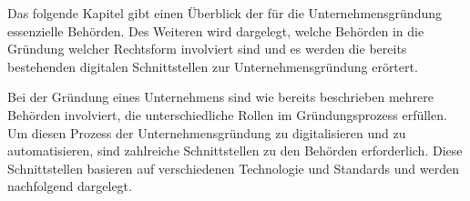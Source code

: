 

Das folgende Kapitel gibt einen Überblick der für die Unternehmensgründung essenzielle Behörden. 
Des Weiteren wird dargelegt, welche Behörden in die Gründung welcher Rechtsform involviert sind und 
es werden die bereits bestehenden digitalen Schnittstellen zur Unternehmensgründung erörtert.

Bei der Gründung eines Unternehmens sind wie bereits beschrieben mehrere Behörden
involviert, die unterschiedliche Rollen im Gründungsprozess erfüllen.
Um diesen Prozess der Unternehmensgründung zu digitalisieren und zu automatisieren, sind zahlreiche Schnittstellen zu den Behörden erforderlich.
Diese Schnittstellen basieren auf verschiedenen Technologie und Standards und werden nachfolgend dargelegt.

